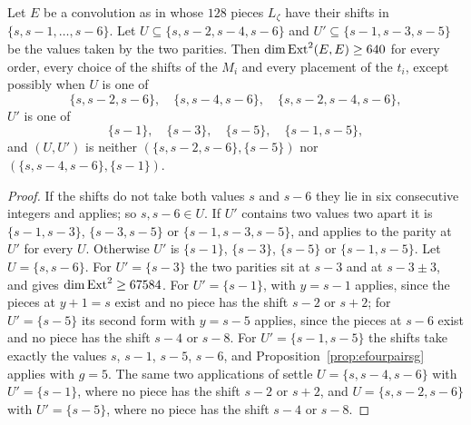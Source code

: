\begin{corollary}\label{cor:efourseven}
Let $E$ be a convolution as in \cite[Lemma~18.36]{BMB26} whose $128$ pieces $L_{\zeta}$ have their shifts in $\{s,s-1,\dots,s-6\}$. Let $U\subseteq\{s,s-2,s-4,s-6\}$ and $U'\subseteq\{s-1,s-3,s-5\}$ be the values taken by the two parities. Then $\dim\mathrm{Ext}^{2}(E,E)\ge640$ for every order, every choice of the shifts of the $M_{i}$ and every placement of the $t_{i}$, except possibly when $U$ is one of
\[
\{s,s-2,s-6\},\quad\{s,s-4,s-6\},\quad\{s,s-2,s-4,s-6\},
\]
$U'$ is one of
\[
\{s-1\},\quad\{s-3\},\quad\{s-5\},\quad\{s-1,s-5\},
\]
and $(U,U')$ is neither $(\{s,s-2,s-6\},\{s-5\})$ nor $(\{s,s-4,s-6\},\{s-1\})$.
\end{corollary}

\begin{proof}
If the shifts do not take both values $s$ and $s-6$ they lie in six consecutive integers and \cite[Cor.~18.48]{BMB26} applies; so $s,s-6\in U$. If $U'$ contains two values two apart it is $\{s-1,s-3\}$, $\{s-3,s-5\}$ or $\{s-1,s-3,s-5\}$, and \cite[Thm.~18.41]{BMB26} applies to the parity at $U'$ for every $U$. Otherwise $U'$ is $\{s-1\}$, $\{s-3\}$, $\{s-5\}$ or $\{s-1,s-5\}$. Let $U=\{s,s-6\}$. For $U'=\{s-3\}$ the two parities sit at $s-3$ and at $s-3\pm3$, and \cite[Thm.~18.42]{BMB26} gives $\dim\mathrm{Ext}^{2}\ge67584$. For $U'=\{s-1\}$, \cite[Prop.~18.43]{BMB26} with $y=s-1$ applies, since the pieces at $y+1=s$ exist and no piece has the shift $s-2$ or $s+2$; for $U'=\{s-5\}$ its second form with $y=s-5$ applies, since the pieces at $s-6$ exist and no piece has the shift $s-4$ or $s-8$. For $U'=\{s-1,s-5\}$ the shifts take exactly the values $s$, $s-1$, $s-5$, $s-6$, and Proposition~\ref{prop:efourpairsg} applies with $g=5$. The same two applications of \cite[Prop.~18.43]{BMB26} settle $U=\{s,s-4,s-6\}$ with $U'=\{s-1\}$, where no piece has the shift $s-2$ or $s+2$, and $U=\{s,s-2,s-6\}$ with $U'=\{s-5\}$, where no piece has the shift $s-4$ or $s-8$.
\end{proof}

